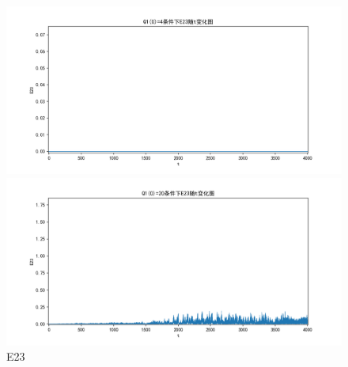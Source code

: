 \documentclass[10pt, a4paper]{article}
\begin{document}
    \begin{figure}[H]
        \begin{minipage}[t]{0.49\textwidth}
            \centering
            \includegraphics[width=\textwidth]{./q5_pics/cmp/E23.png}
        \end{minipage}
        \begin{minipage}[t]{0.49\textwidth}
            \centering
            \includegraphics[width=\textwidth]{./q5_pics/exp/E23.png}
        \end{minipage}
        \caption{E23}\label{fig:E23 in q5}
    \end{figure}
\end{document}
